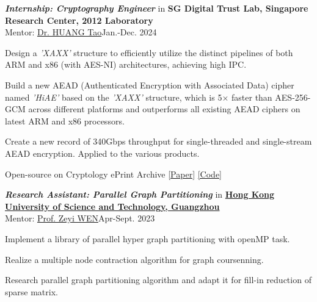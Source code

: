 \documentclass[10pt]{article}
\newenvironment{outerlist}[1][\enskip\textbullet]%
        {%
        \begin{itemize}[label=#1, itemsep=1pt]}{\end{itemize}%
         \vspace{-0.6\baselineskip}}
\newenvironment{innerlist}[1][\enskip$\circ$]%
        {\begin{compactitem}[#1]}{\end{compactitem}}
\begin{document}
\begin{outerlist}
\item {\it\textbf{Internship: Cryptography Engineer}} in \textbf{SG Digital Trust Lab, Singapore Research Center, 2012 Laboratory}\\
Mentor: \href{mailto:huangtao80@huawei.com}{Dr. HUANG Tao}\hfill Jan.-Dec.  2024\\
\vspace{-0.2in}
\begin{innerlist}
        \item Design a \textit{'XAXX'} structure to efficiently utilize the distinct pipelines of both ARM and x86 (with AES-NI) architectures, achieving high IPC.
        \item Build a new AEAD (Authenticated Encryption with Associated Data) cipher named \textit{'HiAE'} based on the \textit{'XAXX'} structure, which is 5$\times$ faster than AES-256-GCM across different platforms and outperforms all existing AEAD ciphers on latest ARM and x86 processors.
        \item Create a new record of 340Gbps throughput for single-threaded and single-stream AEAD encryption. Applied to the various products.
        \item Open-source on Cryptology ePrint Archive \space \href{https://eprint.iacr.org/2025/377}{[Paper]} \space \href{https://github.com/Concyclics/HiAE}{[Code]}
\end{innerlist}

\item {\it\textbf{Research Assistant: Parallel Graph Partitioning}} in \textbf{\href{https://hkust-gz.edu.cn/zh/?variant=zh-cn}{Hong Kong University of Science and Technology, Guangzhou}}\\
Mentor: \href{https://zeyiwen.github.io/}{Prof. Zeyi WEN}\hfill Apr-Sept.  2023\\
\vspace{-0.2in}
\begin{innerlist}
        \item Implement a library of parallel hyper graph partitioning with openMP task.
        \item Realize a multiple node contraction algorithm for graph coursenning.
        \item Research parallel graph partitioning algorithm and adapt it for fill-in reduction of sparse matrix.
\end{innerlist}


\end{outerlist}
\end{document}
